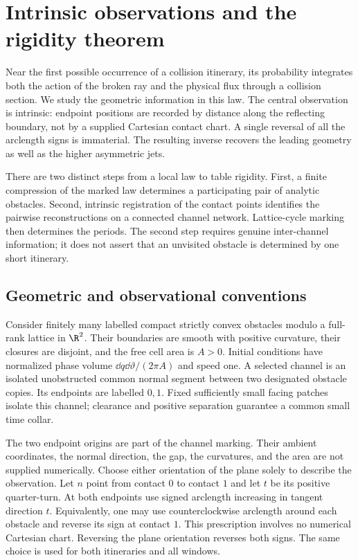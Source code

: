 \section{Intrinsic observations and the rigidity theorem}
\label{sec:introduction}
Near the first possible occurrence of a collision itinerary, its
probability integrates both the action of the broken ray and the physical
flux through a collision section. We study the geometric information in
this law. The central observation is intrinsic: endpoint positions are
recorded by distance along the reflecting boundary, not by a supplied
Cartesian contact chart. A single reversal of all the arclength signs
is immaterial. The resulting inverse recovers the leading geometry as
well as the higher asymmetric jets.

There are two distinct steps from a local law to table rigidity.
First, a finite compression of the marked law determines a participating
pair of analytic obstacles. Second, intrinsic registration of the contact
points identifies the pairwise reconstructions on a connected channel
network. Lattice-cycle marking then determines the periods. The second
step requires genuine inter-channel information; it does not assert that
an unvisited obstacle is determined by one short itinerary.

\subsection{Geometric and observational conventions}
Consider finitely many labelled compact strictly convex obstacles modulo
a full-rank lattice in $\R^2$. Their boundaries are smooth with positive
curvature, their closures are disjoint, and the free cell area is $A>0$.
Initial conditions have normalized phase volume
$\dd q\dd\vartheta/(2\pi A)$ and speed one. A selected channel is an
isolated unobstructed common normal segment between two designated
obstacle copies. Its endpoints are labelled $0,1$. Fixed sufficiently
small facing patches isolate this channel; clearance and positive
separation guarantee a common small time collar.

The two endpoint origins are part of the channel marking. Their ambient
coordinates, the normal direction, the gap, the curvatures, and the area
are not supplied numerically. Choose either orientation of the plane
solely to describe the observation. Let $n$ point from contact $0$ to
contact $1$ and let $t$ be its positive quarter-turn. At both endpoints
use signed arclength increasing in tangent direction $t$. Equivalently,
one may use counterclockwise arclength around each obstacle and reverse
its sign at contact $1$. This prescription involves no numerical
Cartesian chart. Reversing the plane orientation reverses both signs.
The same choice is used for both itineraries and all windows.

